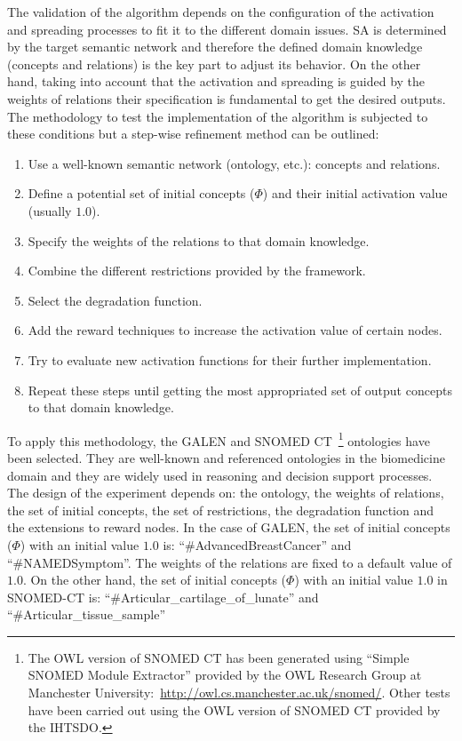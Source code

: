 The validation of the algorithm depends on the configuration of the activation and spreading processes to
fit it to the different domain issues. SA is determined by the target semantic network and therefore
the defined domain knowledge (concepts and relations) is the key part to adjust its behavior. On the other
hand, taking into account that the activation and spreading is guided by the weights of relations their specification 
is fundamental to get the desired outputs. The methodology to test the implementation
of the algorithm is subjected to these conditions but a step-wise refinement method can be outlined:
\begin{enumerate}
  \item Use a well-known semantic network (ontology, etc.): concepts and relations.
  \item Define a potential set of initial concepts ($\Phi$) and their initial activation value (usually $1.0$).
  \item Specify the weights of the relations to that domain knowledge.
  \item Combine the different restrictions provided by the framework.
  \item Select the degradation function.
  \item Add the reward techniques to increase the activation value of certain nodes.
  \item Try to evaluate new activation functions for their further implementation.
  \item Repeat these steps until getting the most appropriated set of output concepts to that domain knowledge.
\end{enumerate}

To apply this methodology, the GALEN and SNOMED CT~\footnote{The OWL version of SNOMED CT has been generated using ``Simple SNOMED Module Extractor'' provided by the OWL Research Group at Manchester University:~\url{http://owl.cs.manchester.ac.uk/snomed/}. Other tests 
have been carried out using the OWL version of SNOMED CT provided by the IHTSDO.} ontologies have been selected. 
They are well-known and referenced ontologies in the biomedicine domain and they are widely used in reasoning and decision support processes. 
The design of the experiment depends on: the ontology, the weights of relations, the set of initial concepts, 
the set of restrictions, the degradation function and the extensions to reward nodes. 
In the case of GALEN, the set of initial concepts ($\Phi$) with an initial value $1.0$ is: 
``\#AdvancedBreastCancer'' and ``\#NAMEDSymptom''. The weights of the 
relations are fixed to a default value of $1.0$. On the other hand, the set of initial concepts ($\Phi$) with an initial value $1.0$ 
in SNOMED-CT is: ``\#Articular\_cartilage\_of\_lunate'' and ``\#Articular\_tissue\_sample''

